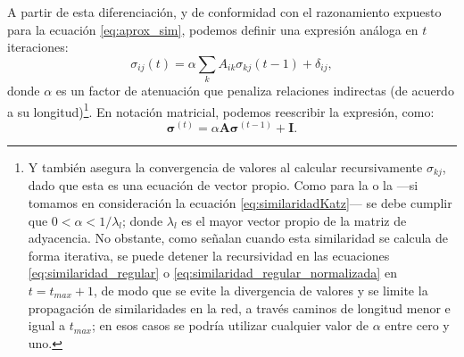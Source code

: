 \documentclass[letterpaper, 11pt]{book}
\theoremstyle{definition}
\theoremstyle{remark}
\begin{document}
A partir de esta diferenciación, y de conformidad con el razonamiento expuesto para la ecuación \ref{eq:aprox_sim}, podemos definir una expresión análoga en $t$ iteraciones: 
\begin{equation}\label{eq:similaridad_regular}
    \sigma_{ij}(t) = \alpha \sum_{k} A_{ik} \sigma_{kj}(t-1) + \delta_{ij},
\end{equation}
donde $\alpha$ es un factor de atenuación que penaliza relaciones indirectas (de acuerdo a su longitud)\footnote{
    Y  también asegura la convergencia de valores al calcular recursivamente $\sigma_{kj}$, dado que esta es una ecuación de vector propio. 
    Como para la  o la  ---si tomamos en consideración la ecuación \ref{eq:similaridadKatz}--- se debe cumplir que $0 < \alpha < 1/\lambda_l$; donde $\lambda_l$ es el mayor vector propio de la matriz de adyacencia. 
    No obstante, como señalan \citet{2018_Duricic_RegularEquivalence} cuando esta similaridad se calcula de forma iterativa, se puede detener la recursividad en las ecuaciones \ref{eq:similaridad_regular} o \ref{eq:similaridad_regular_normalizada} en $t = t_{max}+1$, de modo que se evite la divergencia de valores y se limite la propagación de similaridades en la red, a través caminos de longitud menor e igual a $t_{max}$; en esos casos se podría utilizar cualquier valor de $\alpha$ entre cero y uno. 
}. 
En notación matricial, podemos reescribir la expresión, como:
\begin{equation}\label{eq:similaridad_regular_matrix}
    \mathbf{\sigma}^{(t)} = 
    \alpha \mathbf{A}\mathbf{\sigma}^{(t-1)} + \mathbf{I}.
\end{equation}
\end{document}
